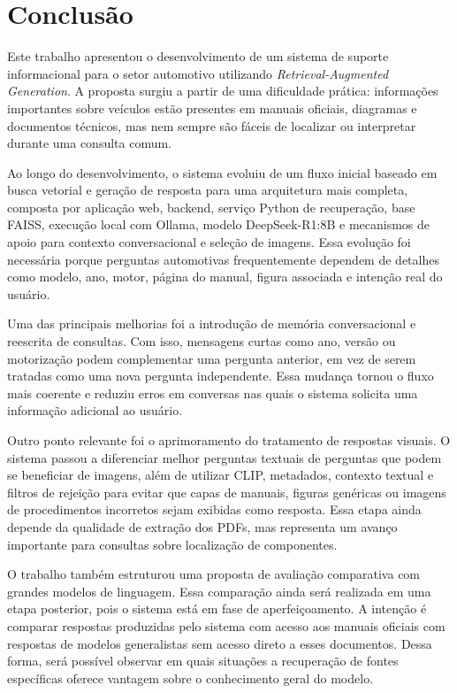 \chapter[Conclusão]{Conclusão}
\label{cap:conclusao}

Este trabalho apresentou o desenvolvimento de um sistema de suporte informacional para o setor automotivo utilizando \textit{Retrieval-Augmented Generation}. A proposta surgiu a partir de uma dificuldade prática: informações importantes sobre veículos estão presentes em manuais oficiais, diagramas e documentos técnicos, mas nem sempre são fáceis de localizar ou interpretar durante uma consulta comum.

Ao longo do desenvolvimento, o sistema evoluiu de um fluxo inicial baseado em busca vetorial e geração de resposta para uma arquitetura mais completa, composta por aplicação web, backend, serviço Python de recuperação, base FAISS, execução local com Ollama, modelo DeepSeek-R1:8B e mecanismos de apoio para contexto conversacional e seleção de imagens. Essa evolução foi necessária porque perguntas automotivas frequentemente dependem de detalhes como modelo, ano, motor, página do manual, figura associada e intenção real do usuário.

Uma das principais melhorias foi a introdução de memória conversacional e reescrita de consultas. Com isso, mensagens curtas como ano, versão ou motorização podem complementar uma pergunta anterior, em vez de serem tratadas como uma nova pergunta independente. Essa mudança tornou o fluxo mais coerente e reduziu erros em conversas nas quais o sistema solicita uma informação adicional ao usuário.

Outro ponto relevante foi o aprimoramento do tratamento de respostas visuais. O sistema passou a diferenciar melhor perguntas textuais de perguntas que podem se beneficiar de imagens, além de utilizar CLIP, metadados, contexto textual e filtros de rejeição para evitar que capas de manuais, figuras genéricas ou imagens de procedimentos incorretos sejam exibidas como resposta. Essa etapa ainda depende da qualidade de extração dos PDFs, mas representa um avanço importante para consultas sobre localização de componentes.

O trabalho também estruturou uma proposta de avaliação comparativa com grandes modelos de linguagem. Essa comparação ainda será realizada em uma etapa posterior, pois o sistema está em fase de aperfeiçoamento. A intenção é comparar respostas produzidas pelo sistema com acesso aos manuais oficiais com respostas de modelos generalistas sem acesso direto a esses documentos. Dessa forma, será possível observar em quais situações a recuperação de fontes específicas oferece vantagem sobre o conhecimento geral do modelo.

